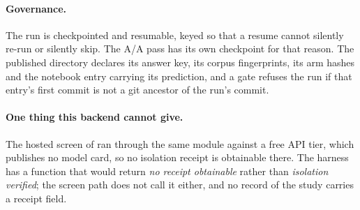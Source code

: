 \paragraph{Governance.} The run is checkpointed and resumable, keyed so that
a resume cannot silently re-run or silently skip. The A/A pass has its own
checkpoint for that reason. The published directory declares its answer key,
its corpus fingerprints, its arm hashes and the notebook entry carrying its
prediction, and a gate refuses the run if that entry's first commit is not a
git ancestor of the run's commit.

\paragraph{One thing this backend cannot give.} The hosted screen of
 ran through the same module against a free API tier,
which publishes no model card, so no isolation receipt is obtainable there.
The harness has a function that would return \emph{no receipt obtainable}
rather than \emph{isolation verified}; the screen path does not call it
either, and no record of the study carries a receipt field.

